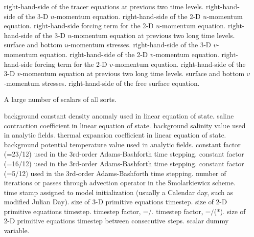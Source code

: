 \begin{klist}
\begin{klist}
            right-hand-side of the tracer equations at
   previous two time levels.
               right-hand-side of the 3-D $u$-momentum
   equation.
            right-hand-side of the 2-D $u$-momentum
   equation.
            right-hand-side forcing term for the 2-D
   $u$-momentum equation.
            right-hand-side of the 3-D $u$-momentum
   equation at previous two long time levels.
            surface and bottom $u$-momentum stresses.
               right-hand-side of the 3-D $v$-momentum
   equation.
            right-hand-side of the 2-D $v$-momentum
   equation.
            right-hand-side forcing term for the 2-D
   $v$-momentum equation.
            right-hand-side of the 3-D $v$-momentum
   equation at previous two long time levels.
            surface and bottom $v$-momentum stresses.
            right-hand-side of the free surface equation.
    \end{klist}
    A large number of scalars of all sorts.
    \begin{klist}
            background constant density anomaly used
    in linear equation of state.
         saline contraction coefficient in linear equation
    of state.
            background salinity value used in analytic
    fields.
         thermal expansion coefficient in linear equation
    of state.
            background potential temperature value
    used in analytic fields.
          constant factor (=23/12) used in the
    3rd-order Adams-Bashforth time stepping.
          constant factor (=16/12) used in the
    3rd-order Adams-Bashforth time stepping.
          constant factor (=5/12)  used in the
    3rd-order Adams-Bashforth time stepping.
       number of iterations or passes through advection
    operator in the Smolarkiewicz scheme.
        time stamp assigned to model initialization
    (usually a Calendar day, such as modified Julian Day).
            size of 3-D primitive equations timestep.
        size of 2-D primitive equations timestep.
         timestep factor, =/.
        timestep factor,
   =/(*).
       size of 2-D primitive equations timestep
    between consecutive steps.
        scalar dummy variable.

\end{klist}
\end{klist}
